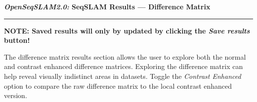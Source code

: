 \centerline{\textbf{\textit{OpenSeqSLAM2.0:} SeqSLAM Results --- Difference Matrix}}
\noindent\rule{\textwidth}{2pt}
\centerline{\textbf{NOTE: Saved results will only by updated by clicking the \textit{Save results} button!}}
\bigskip
\parbox{\textwidth}{The difference matrix results section allows the user to explore both the normal and contrast enhanced difference matrices. Exploring the difference matrix can help reveal visually indistinct areas in datasets. Toggle the \textit{Contrast Enhanced} option to compare the raw difference matrix to the local contrast enhanced version.}
\bigskip
